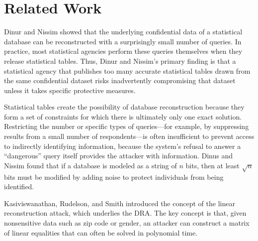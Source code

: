 \documentclass[runningheads]{llncs}
\newif\iflongversion
\begin{document}
\section{Related Work}

Dinur and Nissim\cite{noise} showed that the underlying
confidential data of a statistical database can be reconstructed with
a surprisingly small number of queries. In practice, most statistical
agencies perform these queries themselves when they release
statistical tables. Thus, Dinur and Nissim's primary finding
is that a statistical agency that publishes too many accurate statistical
tables drawn from the same confidential dataset risks inadvertently
compromising that dataset unless it takes specific protective measures.

Statistical tables create the possibility of database reconstruction
because they form a set of constraints for which there is ultimately
only one exact solution. Restricting
the number or specific types of queries---for example, by suppressing
results from a small number of respondents---is often insufficient to prevent access
to indirectly identifying information, because the system's refusal to
answer a ``dangerous'' query itself provides the attacker with information. 
Dinus and Nissim found that if a database is modeled as a string of $n$ bits,
then at least $\sqrt{n}$ bits must be modified by adding noise to
protect individuals from being identified.

Kasiviswanathan, Rudelson, and Smith\cite{Kasiviswanathan:2013:PLR:2627817.2627919} introduced
the concept of the linear reconstruction attack, which underlies the  DRA. The key concept is that,
given nonsensitive data such as zip code or gender, an attacker
can construct a matrix of linear equalities that can often be solved
in polynomial time. \iflongversion The paper also analyzes a common reconstruction
technique known as least squares decoding, where the attacker sets up
a goal function to minimize the square of the distance between two
databases in order to reconstruct the original database.\fi

\iflongversion
Brown and Heathers\cite{doi:10.1177/1948550616673876} developed the
granularity-related inconsistency of means (GRIM) test in response to
observed inconsistencies in published data from psychological
journals. This test is centered around the premise that, for
statistics drawn from integer data, only certain means are
possible. The GRIM test determines whether reported means could
possibly have come from data sets with a certain size, granularity,
and group number. In surveying 71 published articles, the authors
found 36 papers with one inconsistency and 16 with two or more
inconsistencies. Although this test was intended to detect possible
errors or mean falsification in published articles, the concept of
drawing inferential conclusions about a data set based only on 
published statistics is a key concept behind the DRA.
\fi
\end{document}
